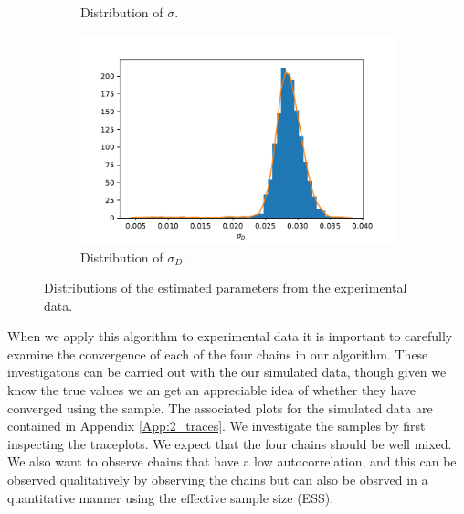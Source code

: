 \begin{figure}[h!]
\begin{subfigure}{.5\textwidth}
  \caption{Distribution of $\sigma$.}
  \label{fig:subhistsigma}
\end{subfigure}%
\begin{subfigure}{.5\textwidth}
  \centering
  \includegraphics[width=\linewidth]{figures/bayesian/EXP_Q/hist_sigmaD.pdf}
  \caption{Distribution of $\sigma_D$.}
  \label{fig:subhistsigmad}
\end{subfigure}
    \caption{Distributions of the estimated parameters from the experimental data.}%
    \label{fig:EXP_histograms}%
\end{figure}%



When we apply this algorithm to experimental data it is important to carefully examine the convergence of each of the four chains in our algorithm. These investigatons can be carried out with the our simulated data, though given we know the true values we an get an appreciable idea of whether they have converged using the sample. The associated plots for the simulated data are contained in Appendix \ref{App:2_traces}. We investigate the samples by first inspecting the traceplots. We expect that the four chains should be well mixed. We also want to observe chains that have a low autocorrelation, and this can be observed qualitatively by observing the chains but can also be obsrved in a quantitative manner using the effective sample size (ESS).


